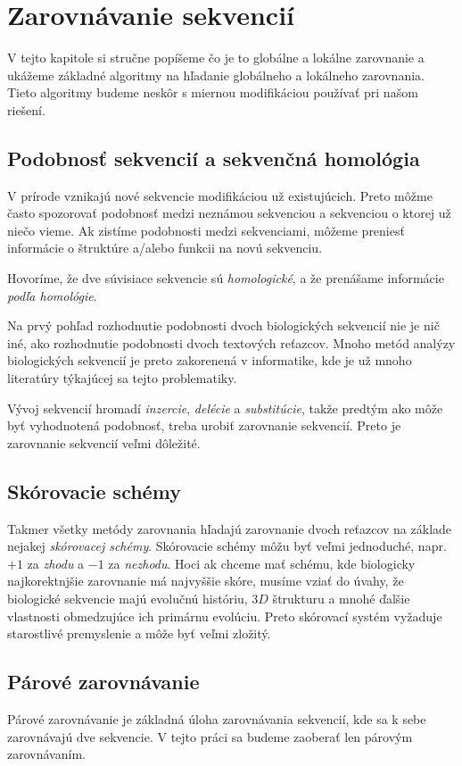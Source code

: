 \chapter{Zarovnávanie sekvencií}

V tejto kapitole si stručne popíšeme čo je to globálne a lokálne zarovnanie a ukážeme základné algoritmy na hľadanie globálneho a lokálneho zarovnania. Tieto algoritmy budeme neskôr s miernou modifikáciou používať pri našom riešení.

\section{Podobnosť sekvencií a sekvenčná homológia}
V prírode vznikajú nové sekvencie modifikáciou už existujúcich. Preto môžme často spozorovať podobnosť medzi neznámou sekvenciou a sekvenciou o ktorej už niečo vieme. Ak zistíme podobnosti medzi sekvenciami, môžeme preniesť informácie o štruktúre a/alebo funkcii na novú sekvenciu.

Hovoríme, že dve súvisiace sekvencie sú \textit{homologické}, a že prenášame informácie \textit{podľa homológie}.

Na prvý pohľad rozhodnutie podobnosti dvoch biologických sekvencií nie je nič iné, ako rozhodnutie podobnosti dvoch textových reťazcov. Mnoho metód analýzy biologických sekvencií je preto zakorenená v informatike, kde je už mnoho literatúry týkajúcej sa tejto problematiky.

Vývoj sekvencií hromadí \textit{inzercie}, \textit{delécie} a \textit{substitúcie}, takže predtým ako môže byť vyhodnotená podobnosť, treba urobiť zarovnanie sekvencií. Preto je zarovnanie sekvencií veľmi dôležité.

\section{Skórovacie schémy}
Takmer všetky metódy zarovnania hľadajú zarovnanie dvoch reťazcov na základe nejakej \textit{skórovacej schémy}. Skórovacie schémy môžu byť veľmi jednoduché, napr. $+1$ za \textit{zhodu} a $-1$ za \textit{nezhodu}. Hoci ak chceme mať schému, kde biologicky najkorektnjšie zarovnanie má najvyššie skóre, musíme vziať do úvahy, že biologické sekvencie majú evolučnú históriu, $3D$ štrukturu a mnohé ďalšie vlastnosti obmedzujúce ich primárnu evolúciu. Preto skórovací systém vyžaduje starostlivé premyslenie a môže byť veľmi zložitý.

\section{Párové zarovnávanie}
Párové zarovnávanie je základná úloha zarovnávania sekvencií, kde sa k sebe zarovnávajú dve sekvencie. V tejto práci sa budeme zaoberať len párovým zarovnávaním.

